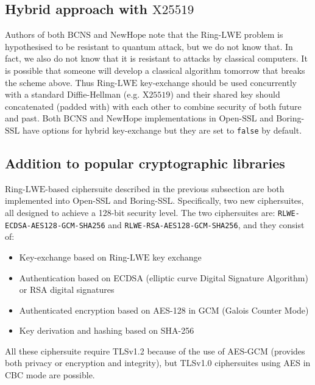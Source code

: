 \subsection{Hybrid approach with \texorpdfstring{$\mathrm{X25519}$}{X25519}}
Authors of both $\mathrm{BCNS}$ and $\mathrm{NewHope}$ note that the Ring-$\mathrm{LWE}$ problem is hypothesised to be resistant to quantum attack, but we do not know that. In fact, we also do not know that it is resistant to attacks by classical computers. It is possible that someone will develop a classical algorithm tomorrow that breaks the scheme above. Thus Ring-$\mathrm{LWE}$ key-exchange should be used concurrently with a standard Diffie-Hellman (e.g. $\mathrm{X25519}$) and their shared key should concatenated (padded with) with each other to combine security of both future and past. Both $\mathrm{BCNS}$ and $\mathrm{NewHope}$ implementations in Open-$\mathrm{SSL}$ and Boring-$\mathrm{SSL}$ have options for hybrid key-exchange but they are set to {\lstinline[basicstyle=\ttfamily\color{black}]|false|} by default.

\subsection{Addition to popular cryptographic libraries}
Ring-$\mathrm{LWE}$-based ciphersuite described in the previous subsection are both implemented into Open-SSL and Boring-SSL. Specifically, two new ciphersuites, all designed to achieve a 128-bit security level. The two ciphersuites are: \texttt{RLWE-ECDSA-AES128-GCM-SHA256} and \texttt{RLWE-RSA-AES128-GCM-SHA256}, and they consist of:

\begin{itemize}
    \item Key-exchange based on Ring-$\mathrm{LWE}$ key exchange
    \item Authentication based on ECDSA (elliptic curve Digital Signature Algorithm) or RSA digital signatures
    \item Authenticated encryption based on AES-128 in GCM (Galois Counter Mode)
    \item Key derivation and hashing based on SHA-256
\end{itemize}

All these ciphersuite require TLSv1.2 because of the use of AES-GCM (provides both privacy or encryption and integrity), but TLSv1.0 ciphersuites using AES in CBC mode are possible.
